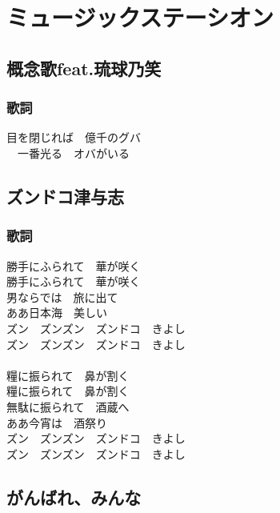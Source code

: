 \section{ミュージックステーシオン}
\subsection{概念歌feat.琉球乃笑}

\subsubsection{歌詞}

目を閉じれば　億千のグバ\\
　一番光る　オバがいる
\subsection{ズンドコ津与志}
\subsubsection{歌詞}
勝手にふられて　華が咲く\\
勝手にふられて　華が咲く\\
男ならでは　旅に出て\\
ああ日本海　美しい\\
ズン　ズンズン　ズンドコ　きよし\\
ズン　ズンズン　ズンドコ　きよし\\
\\
糧に振られて　鼻が割く\\
糧に振られて　鼻が割く\\
無駄に振られて　酒蔵へ\\
ああ今宵は　酒祭り\\
ズン　ズンズン　ズンドコ　きよし\\
ズン　ズンズン　ズンドコ　きよし\\

\newpage
\subsection{がんばれ、みんな}
